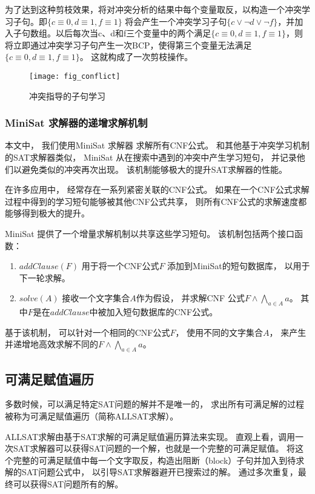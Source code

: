 为了达到这种剪枝效果，将对冲突分析的结果中每个变量取反，以构造一个冲突学习子句。即$\{c \equiv 0, d \equiv 1, f \equiv 1\}$ 将会产生一个冲突学习子句$\{c\vee \neg d \vee \neg f\}$，并加入子句数组。以后每次当c、d和f三个变量中的两个满足$\{c \equiv 0, d \equiv 1, f \equiv 1\}$，则将立即通过冲突学习子句产生一次BCP，使得第三个变量无法满足$\{c \equiv 0,d \equiv 1,f \equiv 1\}$。 这就构成了一次剪枝操作。

\begin{figure}[t] %
  \centering
  \texttt{[image: fig\_conflict]}
  \caption{冲突指导的子句学习}
  \label{confict}
\end{figure}


\subsubsection{MiniSat 求解器的递增求解机制}\label{subsec_incsat}

本文中，
我们使用MiniSat 求解器 求解所有CNF公式。
和其他基于冲突学习机制的SAT求解器类似，
MiniSat 从在搜索中遇到的冲突中产生学习短句，
并记录他们以避免类似的冲突再次出现。
该机制能够极大的提升SAT求解器的性能。

在许多应用中，
经常存在一系列紧密关联的CNF公式。
如果在一个CNF公式求解过程中得到的学习短句能够被其他CNF公式共享，
则所有CNF公式的求解速度都能够得到极大的提升。

MiniSat 提供了一个增量求解机制以共享这些学习短句。
该机制包括两个接口函数：
\begin{enumerate}
\item
$addClause(F)$ 用于将一个CNF公式$F$ 添加到MiniSat的短句数据库，
以用于下一轮求解。
\item
$solve(A)$ 接收一个文字集合$A$作为假设，
并求解CNF 公式$F\wedge \bigwedge_{a\in A} a$。
其中$F$是在$addClause$中被加入短句数据库的CNF公式。
\end{enumerate}

基于该机制，
可以针对一个相同的CNF公式$F$，
使用不同的文字集合$A$，
来产生并递增地高效求解不同的$F\wedge \bigwedge_{a\in A} a$。


\subsection{可满足赋值遍历}\label{subsec_relallsat}
多数时候，可以满足特定SAT问题的解并不是唯一的，
求出所有可满足解的过程被称为可满足赋值遍历（简称ALLSAT求解）。

ALLSAT求解由基于SAT求解的可满足赋值遍历算法来实现。
直观上看，调用一次SAT求解器可以获得SAT问题的一个解，也就是一个完整的可满足赋值。
将这个完整的可满足赋值中每一个文字取反，构造出阻断（block）子句并加入到待求解的SAT问题公式中，
以引导SAT求解器避开已搜索过的解。
通过多次重复，最终可以获得SAT问题所有的解。

